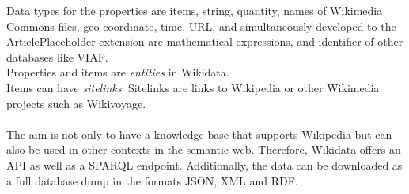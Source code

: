 Data types for the properties are items, string, quantity, names of Wikimedia Commons files, geo coordinate, time, URL,  and simultaneously developed to the ArticlePlaceholder extension are mathematical expressions, and identifier of other databases like VIAF. \\
Properties and items are \textit{entities} in Wikidata. \\
Items can have \textit{sitelinks}. Sitelinks are links to Wikipedia or other Wikimedia projects such as Wikivoyage. \\
\\
The aim is not only to have a knowledge base that supports Wikipedia but can also be used in other contexts in the semantic web. Therefore, Wikidata offers an API as well as a SPARQL endpoint. Additionally, the data can be downloaded as a full database dump in the formats JSON, XML and RDF. 